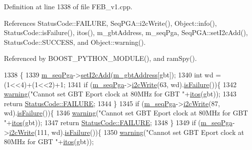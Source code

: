 Definition at line 1338 of file F\+E\+B\+\_\+v1.\+cpp.



References Status\+Code\+::\+F\+A\+I\+L\+U\+RE, Seq\+P\+G\+A\+::i2c\+Write(), Object\+::info(), Status\+Code\+::is\+Failure(), itos(), m\+\_\+gbt\+Address, m\+\_\+seq\+Pga, Seq\+P\+G\+A\+::set\+I2c\+Add(), Status\+Code\+::\+S\+U\+C\+C\+E\+SS, and Object\+::warning().



Referenced by B\+O\+O\+S\+T\+\_\+\+P\+Y\+T\+H\+O\+N\+\_\+\+M\+O\+D\+U\+L\+E(), and ram\+Spy().


\begin{DoxyCode}
1338                                              \{
1339   \hyperlink{classFEB__v1_a6c7804ac86796f233a8393043adf2e77}{m\_seqPga}->\hyperlink{classSeqPGA_a4ef334e4d2cb417b49033dce951728cd}{setI2cAdd}(\hyperlink{classFEB__v1_ac625855df976f16694178f1a4c0eef1e}{m\_gbtAddress}[gbt]);
1340   \textcolor{keywordtype}{int} wd = (1<<4)+(1<<2)+1;
1341   \textcolor{keywordflow}{if} (\hyperlink{classFEB__v1_a6c7804ac86796f233a8393043adf2e77}{m\_seqPga}->\hyperlink{classSeqPGA_a429076ca3a4ece94182bd95c623bb9d0}{i2cWrite}(63, wd).\hyperlink{classStatusCode_a5dd22dc6eb2c52fc4cabc58f6dea2eb7}{isFailure}())\{
1342     \hyperlink{classObject_a65cd4fda577711660821fd2cd5a3b4c9}{warning}(\textcolor{stringliteral}{"Cannot set GBT Eport clock at 80MHz for GBT "}+\hyperlink{Tools_8h_af330027dbdafb9a30768b3613c553e60}{itos}(gbt));
1343     \textcolor{keywordflow}{return} \hyperlink{classStatusCode_a6f565cbeadc76d14c72f047e5e85eb4ba3da73d4c469762eb9d3c960368252b26}{StatusCode::FAILURE};
1344   \}
1345   \textcolor{keywordflow}{if} (\hyperlink{classFEB__v1_a6c7804ac86796f233a8393043adf2e77}{m\_seqPga}->\hyperlink{classSeqPGA_a429076ca3a4ece94182bd95c623bb9d0}{i2cWrite}(87, wd).\hyperlink{classStatusCode_a5dd22dc6eb2c52fc4cabc58f6dea2eb7}{isFailure}())\{
1346     \hyperlink{classObject_a65cd4fda577711660821fd2cd5a3b4c9}{warning}(\textcolor{stringliteral}{"Cannot set GBT Eport clock at 80MHz for GBT "}+\hyperlink{Tools_8h_af330027dbdafb9a30768b3613c553e60}{itos}(gbt));
1347     \textcolor{keywordflow}{return} \hyperlink{classStatusCode_a6f565cbeadc76d14c72f047e5e85eb4ba3da73d4c469762eb9d3c960368252b26}{StatusCode::FAILURE};
1348   \}
1349   \textcolor{keywordflow}{if} (\hyperlink{classFEB__v1_a6c7804ac86796f233a8393043adf2e77}{m\_seqPga}->\hyperlink{classSeqPGA_a429076ca3a4ece94182bd95c623bb9d0}{i2cWrite}(111, wd).\hyperlink{classStatusCode_a5dd22dc6eb2c52fc4cabc58f6dea2eb7}{isFailure}())\{
1350     \hyperlink{classObject_a65cd4fda577711660821fd2cd5a3b4c9}{warning}(\textcolor{stringliteral}{"Cannot set GBT Eport clock at 80MHz for GBT "}+\hyperlink{Tools_8h_af330027dbdafb9a30768b3613c553e60}{itos}(gbt));

\end{DoxyCode}
